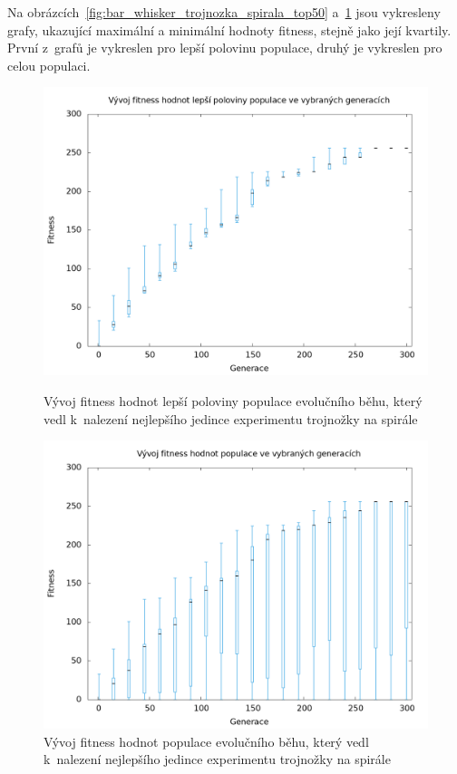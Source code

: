 Na obrázcích~\ref{fig:bar_whisker_trojnozka_spirala_top50} a~\ref{fig:bar_whisker_trojnozka_spirala} jsou vykresleny grafy, ukazující maximální a minimální hodnoty fitness, stejně jako její kvartily.
První z~grafů je vykreslen pro lepší polovinu populace, druhý je vykreslen pro celou populaci.

\begin{figure}[h]
    \begin{minipage}[c]{0.48\linewidth}
        \includegraphics[width=\linewidth]{obrazky/bar_whisker_trojnozka_spirala_top50.png}
        \caption{Vývoj fitness hodnot lepší poloviny populace evolučního běhu, který vedl k~nalezení nejlepšího jedince experimentu trojnožky na spirále}
        \label{fig:bar_whisker_trojnozka_spirala_top50}

    \end{minipage}
    \hfill
    \begin{minipage}[c]{0.48\linewidth}
        \includegraphics[width=\linewidth]{obrazky/bar_whisker_trojnozka_spirala.png}
        \caption{Vývoj fitness hodnot populace evolučního běhu, který vedl k~nalezení nejlepšího jedince experimentu trojnožky na spirále}
        \label{fig:bar_whisker_trojnozka_spirala}

    \end{minipage}
\end{figure}

